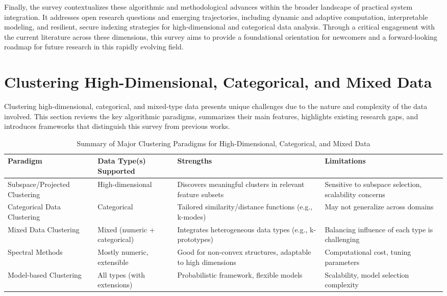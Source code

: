 \documentclass[sigconf]{acmart}
\begin{document}
Finally, the survey contextualizes these algorithmic and methodological advances within the broader landscape of practical system integration. It addresses open research questions and emerging trajectories, including dynamic and adaptive computation, interpretable modeling, and resilient, secure indexing strategies for high-dimensional and categorical data analysis. Through a critical engagement with the current literature across these dimensions, this survey aims to provide a foundational orientation for newcomers and a forward-looking roadmap for future research in this rapidly evolving field.

\section{Clustering High-Dimensional, Categorical, and Mixed Data}

Clustering high-dimensional, categorical, and mixed-type data presents unique challenges due to the nature and complexity of the data involved. This section reviews the key algorithmic paradigms, summarizes their main features, highlights existing research gaps, and introduces frameworks that distinguish this survey from previous works.

\begin{table*}[htbp]
\centering
\caption{Summary of Major Clustering Paradigms for High-Dimensional, Categorical, and Mixed Data}
\label{tab:clustering-paradigms}
\begin{adjustbox}{max width=\textwidth}
\begin{tabular}{@{}llll@{}}
\toprule
Paradigm & Data Type(s) Supported & Strengths & Limitations \\
\midrule
Subspace/Projected Clustering & High-dimensional & Discovers meaningful clusters in relevant feature subsets & Sensitive to subspace selection, scalability concerns \\
Categorical Data Clustering & Categorical & Tailored similarity/distance functions (e.g., k-modes) & May not generalize across domains \\
Mixed Data Clustering & Mixed (numeric + categorical) & Integrates heterogeneous data types (e.g., k-prototypes) & Balancing influence of each type is challenging \\
Spectral Methods & Mostly numeric, extensible & Good for non-convex structures, adaptable to high dimensions & Computational cost, tuning parameters \\
Model-based Clustering & All types (with extensions) & Probabilistic framework, flexible models & Scalability, model selection complexity \\
\bottomrule
\end{tabular}
\end{adjustbox}
\end{table*}
\end{document}
